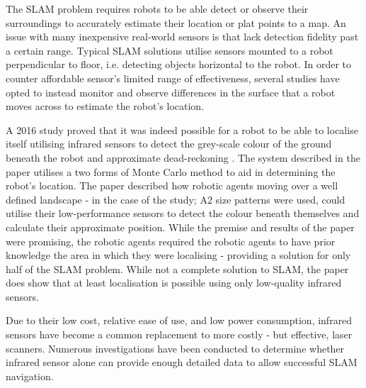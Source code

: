 The SLAM problem requires robots to be able detect or observe their
surroundings to accurately estimate their location or plat points to a map.
An issue with many inexpensive real-world sensors is that lack detection
fidelity past a certain range.
Typical SLAM solutions utilise sensors mounted to a robot perpendicular to
floor, i.e. detecting objects horizontal to the robot.
In order to counter affordable sensor's limited range of effectiveness, several
studies have opted to instead monitor and observe differences in the surface
that a robot moves across to estimate the robot's location.

A 2016 study proved that it was indeed possible for a robot to be able to
localise itself utilising infrared sensors to detect the grey-scale colour of
the ground beneath the robot and approximate dead-reckoning \cite{Wang2016}.
The system described in the paper utilises a two forms of  Monte Carlo
method to aid in determining the robot's location.
The paper described how robotic agents moving over a well defined landscape -
in the case of the study; A2 size patterns were used, could utilise
their low-performance sensors to detect the colour beneath themselves and
calculate their approximate position.
While the premise and results of the paper were promising, the robotic agents
required the robotic agents to have prior knowledge the area in which they
were localising - providing a solution for only half of the SLAM problem.
While not a complete solution to SLAM, the paper does show that at least
localisation is possible using only low-quality infrared sensors.

Due to their low cost, relative ease of use, and low power consumption,
infrared sensors have become a common replacement to more costly - but
effective, laser scanners.
Numerous investigations have been conducted to determine whether infrared
sensor alone can provide enough detailed data to allow successful SLAM
navigation.

